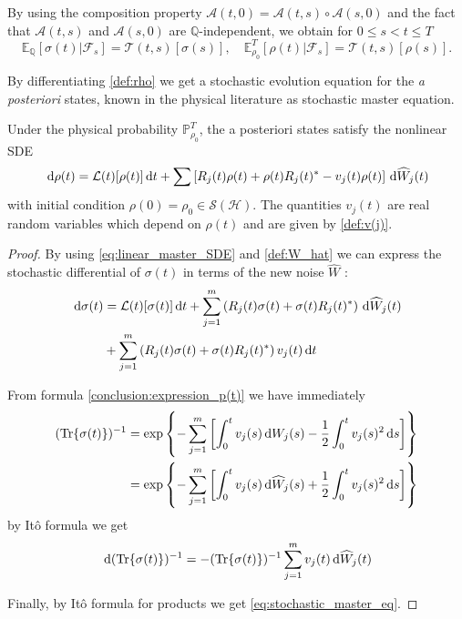 By using the composition property $\mathcal{A}(t, 0)=\mathcal{A}(t, s) \circ \mathcal{A}(s, 0)$ and the fact that $\mathcal{A}(t, s)$ and $\mathcal{A}(s, 0)$ are $\mathbb{Q}$-independent, we obtain for $0 \leq s<t \leq T$ \[ \mathbb{E}_{\mathbb{Q}}\left[\sigma(t) | \mathcal{F}_{s}\right]=\mathcal{T}(t, s)[\sigma(s)], \quad \mathbb{E}_{\rho_{0}}^{T}\left[\rho(t) | \mathcal{F}_{s}\right]=\mathcal{T}(t, s)[\rho(s)]. \]

By differentiating \eqref{def:rho} we get a stochastic evolution equation for the \textit{a posteriori} states, known in the physical literature as stochastic master equation.

\begin{proposition}
	Under the physical probability $\mathbb{P}_{\rho_{0}}^{T}$, the a posteriori states satisfy the nonlinear SDE
	\begin{equation}\label{eq:stochastic_master_eq}
	\,\mathrm{d} \rho(t)=\mathcal{L}(t)[\rho(t)] \,\mathrm{d} t+\sum\left[R_{j}(t) \rho(t)+\rho(t) R_{j}(t)^{*}-v_{j}(t) \rho(t)\right] \,\mathrm{d} \widehat{W}_{j}(t)
	\end{equation}
	with initial condition $\rho(0)=\rho_{0} \in \mathcal{S}(\mathcal{H})$.
	The quantities $v_{j}(t)$ are real random variables which depend on $\rho(t)$ and are given by \eqref{def:v(j)}.
\end{proposition}

\begin{proof}
	By using \eqref{eq:linear_master_SDE} and \eqref{def:W_hat} we can express the stochastic differential of $\sigma(t)$ in terms of the new noise $\widehat{W}$ :
	\[ \begin{aligned} \,\mathrm{d} \sigma(t)&= \mathcal{L}(t)[\sigma(t)] \,\mathrm{d} t+\sum_{j=1}^{m}\left(R_{j}(t) \sigma(t)+\sigma(t) R_{j}(t)^{*}\right) \,\mathrm{d} \widehat{W}_{j}(t) \\ &+\sum_{j=1}^{m}\left(R_{j}(t) \sigma(t)+\sigma(t) R_{j}(t)^{*}\right) v_{j}(t) \,\mathrm{d} t \end{aligned} \]

	From formula \eqref{conclusion:expression_p(t)} we have immediately \[ \begin{aligned}(\operatorname{Tr}\{\sigma(t)\})^{-1} &=\exp \left\{-\sum_{j=1}^{m}\left[\int_{0}^{t} v_{j}(s) \,\mathrm{d} W_{j}(s)-\frac{1}{2} \int_{0}^{t} v_{j}(s)^{2} \,\mathrm{d} s\right]\right\} \\ &=\exp \left\{-\sum_{j=1}^{m}\left[\int_{0}^{t} v_{j}(s) \,\mathrm{d} \widehat{W}_{j}(s)+\frac{1}{2} \int_{0}^{t} v_{j}(s)^{2} \,\mathrm{d} s\right]\right\} \end{aligned} \]
	by Itô formula we get
	\[ \,\mathrm{d}(\operatorname{Tr}\{\sigma(t)\})^{-1}=-(\operatorname{Tr}\{\sigma(t)\})^{-1} \sum_{j=1}^{m} v_{j}(t) \,\mathrm{d} \widehat{W}_{j}(t) \]

	Finally, by Itô formula for products we get \eqref{eq:stochastic_master_eq}.
\end{proof}

